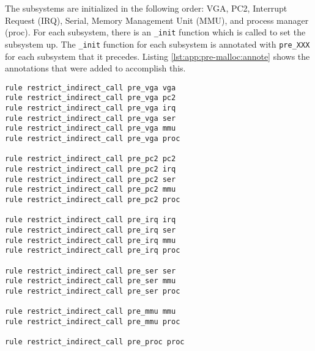 The subsystems are initialized in the following order: VGA, PC2, Interrupt Request (IRQ), Serial, Memory Management Unit (MMU), and process manager (proc).  For each subsystem, there is an \lstinline{_init} function which is called to set the subsystem up.  The \lstinline{_init} function for each subsystem is annotated with \lstinline{pre_XXX} for each subsystem that it precedes.  Listing \ref{lst:app:pre-malloc:annote} shows the annotations that were added to accomplish this.

\noindent\begin{minipage}[t]{\linewidth}
\begin{lstlisting}[caption={Rules file for a simple kernel written for CSC454.  The rules written here are intended to prevent code which runs before a subsystem is initialized from calling any function that depend on the subsystem.},label={lst:app:pre-malloc:rules}]
rule restrict_indirect_call pre_vga vga
rule restrict_indirect_call pre_vga pc2
rule restrict_indirect_call pre_vga irq
rule restrict_indirect_call pre_vga ser
rule restrict_indirect_call pre_vga mmu
rule restrict_indirect_call pre_vga proc

rule restrict_indirect_call pre_pc2 pc2
rule restrict_indirect_call pre_pc2 irq
rule restrict_indirect_call pre_pc2 ser
rule restrict_indirect_call pre_pc2 mmu
rule restrict_indirect_call pre_pc2 proc

rule restrict_indirect_call pre_irq irq
rule restrict_indirect_call pre_irq ser
rule restrict_indirect_call pre_irq mmu
rule restrict_indirect_call pre_irq proc

rule restrict_indirect_call pre_ser ser
rule restrict_indirect_call pre_ser mmu
rule restrict_indirect_call pre_ser proc

rule restrict_indirect_call pre_mmu mmu
rule restrict_indirect_call pre_mmu proc

rule restrict_indirect_call pre_proc proc
\end{lstlisting}
\end{minipage}


